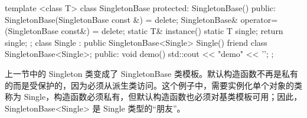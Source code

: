 \begin{cpp}
template <class T>
class SingletonBase
{
    protected:
    SingletonBase() {}
public:
    SingletonBase(SingletonBase const &) = delete;
    SingletonBase& operator=(SingletonBase const&) = delete;
    static T& instance()
    {
        static T single;
        return single;
    }
};
class Single : public SingletonBase<Single>
{
    Single() {}
    friend class SingletonBase<Single>;
public:
    void demo() { std::cout << "demo" << '\n'; }
};
\end{cpp}

上一节中的 Singleton 类变成了 SingletonBase 类模板。默认构造函数不再是私有的而是受保护的，因为必须从派生类访问。这个例子中，需要实例化单个对象的类称为 Single，构造函数必须私有，但默认构造函数也必须对基类模板可用；因此，SingletonBase<Single> 是 Single 类型的“朋友”。


